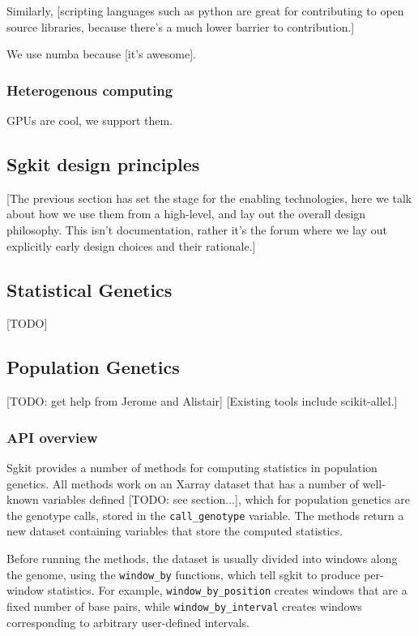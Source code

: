 \documentclass[9pt,lineno]{elife}
\newcommand{\sgapi}[1]{\texttt{#1}}
\begin{document}
Similarly, [scripting languages such as python are great for
contributing to open source libraries, because there's a much
lower barrier to contribution.]

We use numba because [it's awesome].

\subsubsection{Heterogenous computing}

GPUs are cool, we support them.

\subsection{Sgkit design principles}

[The previous section has set the stage for the enabling technologies,
here we talk about how we use them from a high-level, and lay out
the overall design philosophy. This isn't documentation, rather
it's the forum where we lay out explicitly early design choices
and their rationale.]

\subsection{Statistical Genetics}

[TODO]

\subsection{Population Genetics}

[TODO: get help from Jerome and Alistair]
[Existing tools include scikit-allel.]

\subsubsection{API overview}

Sgkit provides a number of methods for computing statistics in population
genetics. All methods work on an Xarray dataset that has a number of well-known
variables defined [TODO: see section...], which for population genetics are the
genotype calls, stored in the \sgapi{call\_genotype} variable. The methods return a
new dataset containing variables that store the computed statistics.

Before running the methods, the dataset is usually divided into windows along
the genome, using the \sgapi{window\_by} functions, which tell sgkit to produce
per-window statistics. For example, \sgapi{window\_by\_position} creates windows that
are a fixed number of base pairs, while \sgapi{window\_by\_interval} creates windows
corresponding to arbitrary user-defined intervals.
\end{document}
